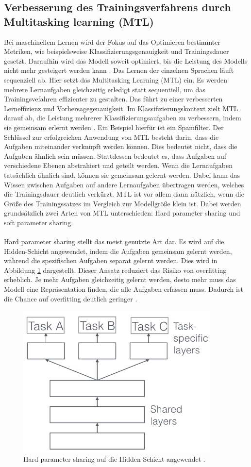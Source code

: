\subsection{Verbesserung des Trainingsverfahrens durch Multitasking learning (MTL)}
 Bei maschinellem Lernen wird der Fokus auf das Optimieren bestimmter Metriken, wie beispielsweise Klassifizierungsgenauigkeit und Trainingsdauer gesetzt. Daraufhin wird das Modell soweit optimiert, bis die Leistung des Modells nicht mehr gesteigert werden kann \cite{Ruder.2017}. Das Lernen der einzelnen Sprachen läuft sequenziell ab. Hier setzt das Multitasking Learning (MTL) ein. Es werden mehrere Lernaufgaben gleichzeitig erledigt statt sequentiell, um das Trainingsvefahren effizienter zu gestalten. Das führt zu einer verbesserten Lerneffizienz und Vorhersagegenauigkeit. Im Klassifizierungskontext zielt MTL darauf ab, die Leistung mehrerer Klassifizierungsaufgaben zu verbessern, indem sie gemeinsam erlernt werden \cite{Lu_multitasklearning}. Ein Beispiel hierfür ist ein Spamfilter. Der Schlüssel zur erfolgreichen Anwendung von MTL besteht darin, dass die Aufgaben miteinander verknüpft werden können. Dies bedeutet nicht, dass die Aufgaben ähnlich sein müssen. Stattdessen bedeutet es, dass Aufgaben auf verschiedene Ebenen abstrahiert und geteilt werden. Wenn die Lernaufgaben tatsächlich ähnlich sind, können sie gemeinsam gelernt werden. Dabei kann das Wissen zwischen Aufgaben auf andere Lernaufgaben übertragen werden, welches die Trainingsdauer deutlich verkürzt. MTL ist vor allem dann nützlich, wenn die Größe des Trainingssatzes im Vergleich zur Modellgröße klein ist. Dabei werden grundsätzlich zwei Arten von MTL unterschieden: Hard parameter sharing und soft parameter sharing. \\ \\ Hard parameter sharing stellt das meist genutzte Art dar\cite{Ruder.2017}. Es wird auf die Hidden-Schicht angewendet, indem die Aufgaben gemeinsam gelernt werden, während die spezifischen Aufgaben separat gelernt werden. Dies wird in Abbildung \ref{fig:hard} dargestellt. Dieser Ansatz reduziert das Risiko von overfitting erheblich. Je mehr Aufgaben gleichzeitig gelernt werden, desto mehr muss das Modell eine Repräsentation finden, die alle Aufgaben erfassen muss. Dadurch ist die Chance auf overfitting deutlich geringer \cite{Ruder.2017} \cite{Lu_multitasklearning}.
  \begin{figure}[h!]
 	\centering
 	\includegraphics[width=0.8\linewidth]{images/hard}
 	\caption{Hard parameter sharing auf die Hidden-Schicht angewendet \cite{Kulbear.2017}.} %
 	\label{fig:hard}
 \end{figure}

